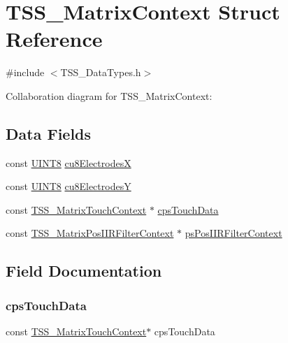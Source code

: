 \hypertarget{struct_t_s_s___matrix_context}{}\section{T\+S\+S\+\_\+\+Matrix\+Context Struct Reference}
\label{struct_t_s_s___matrix_context}


{\ttfamily \#include $<$T\+S\+S\+\_\+\+Data\+Types.\+h$>$}



Collaboration diagram for T\+S\+S\+\_\+\+Matrix\+Context\+:
\subsection*{Data Fields}
\begin{DoxyCompactItemize}
\item 
const \hyperlink{_t_s_s___data_types_8h_ab27e9918b538ce9d8ca692479b375b6a}{U\+I\+N\+T8} \hyperlink{struct_t_s_s___matrix_context_a8637072f4b8c606d4825ec0696c15c41}{cu8\+ElectrodesX}
\item 
const \hyperlink{_t_s_s___data_types_8h_ab27e9918b538ce9d8ca692479b375b6a}{U\+I\+N\+T8} \hyperlink{struct_t_s_s___matrix_context_ad7b04c4a2fbbefdddd2a4ee171cefe37}{cu8\+ElectrodesY}
\item 
const \hyperlink{struct_t_s_s___matrix_touch_context}{T\+S\+S\+\_\+\+Matrix\+Touch\+Context} $\ast$ \hyperlink{struct_t_s_s___matrix_context_a048630f57d3f4e54213b59fe6ee52512}{cps\+Touch\+Data}
\item 
const \hyperlink{struct_t_s_s___matrix_pos_i_i_r_filter_context}{T\+S\+S\+\_\+\+Matrix\+Pos\+I\+I\+R\+Filter\+Context} $\ast$ \hyperlink{struct_t_s_s___matrix_context_ac2cc0f3357fb26b798fcaba3681d583d}{ps\+Pos\+I\+I\+R\+Filter\+Context}
\end{DoxyCompactItemize}


\subsection{Field Documentation}
\mbox{\label{struct_t_s_s___matrix_context_a048630f57d3f4e54213b59fe6ee52512}} 
\subsubsection{\texorpdfstring{cps\+Touch\+Data}{cpsTouchData}}
{\footnotesize\ttfamily const \hyperlink{struct_t_s_s___matrix_touch_context}{T\+S\+S\+\_\+\+Matrix\+Touch\+Context}$\ast$ cps\+Touch\+Data}

